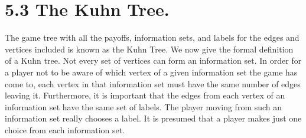 \documentclass[]{report}
\begin{document}
\section{ 5.3 The Kuhn Tree.} The game tree with all the payoffs, information sets, and labels
for the edges and vertices included is known as the Kuhn Tree. We now give the formal
definition of a Kuhn tree.
Not every set of vertices can form an information set. In order for a player not to
be aware of which vertex of a given information set the game has come to, each vertex in
that information set must have the same number of edges leaving it. Furthermore, it is
important that the edges from each vertex of an information set have the same set of labels.
The player moving from such an information set really chooses a label. It is presumed that
a player makes just one choice from each information set.
\end{document}
